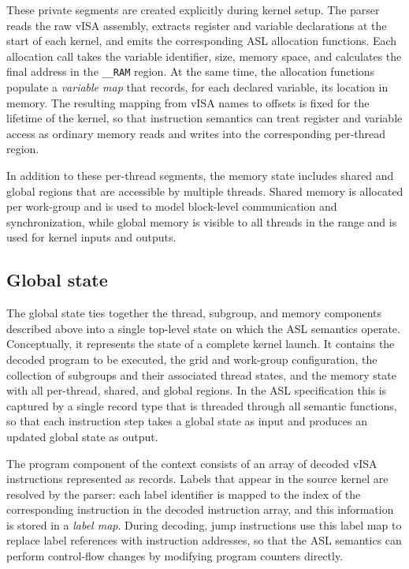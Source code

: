 These private segments are created explicitly during kernel setup. The parser
reads the raw vISA assembly, extracts register and variable declarations at the
start of each kernel, and emits the corresponding ASL allocation functions.
Each allocation call takes the variable identifier, size, memory space, and
calculates the final address in the \lstinline{__RAM} region. At the same time,
the allocation functions populate a \emph{variable map} that records, for each
declared variable, its location in memory. The resulting mapping from vISA
names to offsets is fixed for the lifetime of the kernel, so that instruction
semantics can treat register and variable access as ordinary memory reads and
writes into the corresponding per-thread region.

In addition to these per-thread segments, the memory state includes shared and
global regions that are accessible by multiple threads. Shared memory is
allocated per work-group and is used to model block-level communication and
synchronization, while global memory is visible to all threads in the range and
is used for kernel inputs and outputs.

\subsection{Global state}
The global state ties together the thread, subgroup, and memory components
described above into a single top-level state on which the ASL semantics
operate. Conceptually, it represents the state of a complete kernel launch. It
contains the decoded program to be executed, the grid and work-group
configuration, the collection of subgroups and their associated thread states,
and the memory state with all per-thread, shared, and global regions. In the
ASL specification this is captured by a single record type that is threaded
through all semantic functions, so that each instruction step takes a global
state as input and produces an updated global state as output.

The program component of the context consists of an array of decoded vISA
instructions represented as records. Labels that appear in the source kernel
are resolved by the parser: each label identifier is mapped to the index of the
corresponding instruction in the decoded instruction array, and this
information is stored in a \emph{label map}. During decoding, jump instructions
use this label map to replace label references with instruction addresses, so
that the ASL semantics can perform control-flow changes by modifying program
counters directly.

